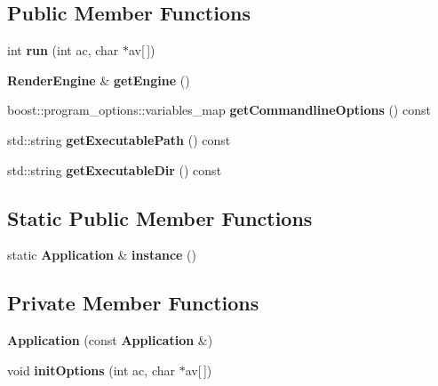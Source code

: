 \subsection*{Public Member Functions}
\begin{DoxyCompactItemize}
\item 
int {\bfseries run} (int ac, char $\ast$av[$\,$])\label{classSoundfieldViewer_1_1Application_ae563231274d6c37fad2260e86a91e074}

\item 
{\bf Render\-Engine} \& {\bfseries get\-Engine} ()\label{classSoundfieldViewer_1_1Application_a60b915671801cd2fb2d451f601d41dcc}

\item 
boost\-::program\-\_\-options\-::variables\-\_\-map {\bfseries get\-Commandline\-Options} () const \label{classSoundfieldViewer_1_1Application_ad5a20d83d82536ab46f8be2b81b6f044}

\item 
std\-::string {\bfseries get\-Executable\-Path} () const \label{classSoundfieldViewer_1_1Application_af61474b8e45640c0af239766b67a1751}

\item 
std\-::string {\bfseries get\-Executable\-Dir} () const \label{classSoundfieldViewer_1_1Application_a1e17e1388ba36f1fab0021ad0e2b309b}

\end{DoxyCompactItemize}
\subsection*{Static Public Member Functions}
\begin{DoxyCompactItemize}
\item 
static {\bf Application} \& {\bfseries instance} ()\label{classSoundfieldViewer_1_1Application_a01b0ac6e684a0245e4bf9f62ac29baa4}

\end{DoxyCompactItemize}
\subsection*{Private Member Functions}
\begin{DoxyCompactItemize}
\item 
{\bfseries Application} (const {\bf Application} \&)\label{classSoundfieldViewer_1_1Application_a829176d2d02e5f89603c1d647bded36b}

\item 
void {\bfseries init\-Options} (int ac, char $\ast$av[$\,$])\label{classSoundfieldViewer_1_1Application_a572c9acc7a80b18273d0bd7c0e4fb789}

\end{DoxyCompactItemize}
